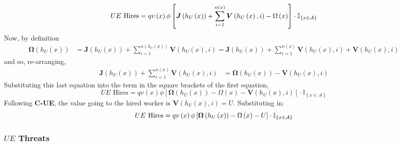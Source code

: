\begin{equation*}
\text{$UE$ Hires}=qv\left( x\right) \phi \left[ \boldsymbol{J}\left( h_{U}\left(
x\right) \right) +\sum\limits_{i=1}^{n\left( x\right) }\boldsymbol{V}\left(
h_{U}\left( x\right) ,i\right) -\Omega \left( x\right) \right] \cdot \mathbb{%
I}_{\left\{ x\in \mathcal{A}\right\} }
\end{equation*}%
Now, by definition
\begin{align*}
\boldsymbol{\Omega }\left( h_{U}\left( x\right) \right) & =\boldsymbol{J}\left(
h_{U}\left( x\right) \right) +\sum\limits_{i=1}^{n\left( h_{U}\left(
x\right) \right) }\boldsymbol{V}\left( h_{U}\left( x\right) ,i\right) =\boldsymbol{J}\left( h_{U}\left( x\right) \right) +\sum\limits_{i=1}^{n\left(
x\right) }\boldsymbol{V}\left( h_{U}\left( x\right) ,i\right) +\boldsymbol{V}\left(
h_{U}\left( x\right) ,i\right)
\end{align*}
and so, re-arranging,
\begin{align*}
\boldsymbol{J}\left( h_{U}\left( x\right) \right) +\sum\limits_{i=1}^{n\left(
x\right) }\boldsymbol{V}\left( h_{U}\left( x\right) ,i\right) & =\boldsymbol{\Omega }%
\left( h_{U}\left( x\right) \right) -\boldsymbol{V}\left( h_{U}\left( x\right)
,i\right)
\end{align*}%
Substituting this last equation into the term in the square brackets of the
first equation,
\begin{equation*}
\text{$UE$ Hires}=qv\left( x\right) \phi \left[ \boldsymbol{\Omega }\left(
h_{U}\left( x\right) \right) -\Omega \left( x\right) -\boldsymbol{V}\left(
h_{U}\left( x\right) ,i\right) \right] \cdot \mathbb{I}_{\left\{ x\in
\mathcal{A}\right\} }
\end{equation*}%
Following \textbf{C-UE}, the value going to the hired worker is $\boldsymbol{V}%
\left( h_{U}\left( x\right) ,i\right) =U$. Substituting in:
\begin{equation*}
\text{$UE$ Hires}=qv\left( x\right) \phi \left[ \boldsymbol{\Omega }\left(
h_{U}\left( x\right) \right) -\Omega \left( x\right) -U\right] \cdot \mathbb{%
I}_{\left\{ x\in \mathcal{A}\right\} }
\end{equation*}

\subsubsection{ $UE$ Threats}

